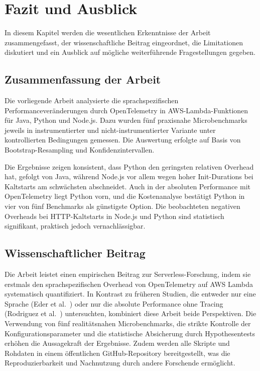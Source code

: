 \chapter{Fazit und Ausblick}
\label{ch:chapter07}

In diesem Kapitel werden die wesentlichen Erkenntnisse der Arbeit zusammengefasst, der wissenschaftliche Beitrag eingeordnet, die 
Limitationen diskutiert und ein Ausblick auf mögliche weiterführende Fragestellungen gegeben.

\section{Zusammenfassung der Arbeit}

Die vorliegende Arbeit analysierte die sprachspezifischen Performanceveränderungen durch OpenTelemetry in AWS-Lambda-Funktionen für Java, 
Python und Node.js. Dazu wurden fünf praxisnahe Microbenchmarks jeweils in instrumentierter und nicht-instrumentierter Variante 
unter kontrollierten Bedingungen gemessen. Die Auswertung erfolgte auf Basis von Bootstrap-Resampling und Konfidenzintervallen.

Die Ergebnisse zeigen konsistent, dass Python den geringsten relativen Overhead hat, gefolgt von Java, während Node.js vor allem 
wegen hoher Init-Durations bei Kaltstarts am schwächsten abschneidet. Auch in der absoluten Performance mit OpenTelemetry liegt 
Python vorn, und die Kostenanalyse bestätigt Python in vier von fünf Benchmarks als günstigste Option. Die beobachteten negativen 
Overheads bei HTTP-Kaltstarts in Node.js und Python sind statistisch signifikant, praktisch jedoch vernachlässigbar.

\section{Wissenschaftlicher Beitrag}

Die Arbeit leistet einen empirischen Beitrag zur Serverless-Forschung, indem sie erstmals den sprachspezifischen Overhead von 
OpenTelemetry auf AWS Lambda systematisch quantifiziert. In Kontrast zu früheren Studien, die entweder nur eine Sprache 
(Eder et al.~\cite{10254754}) oder nur die absolute Performance ohne Tracing (Rodriguez et al.~\cite{Rodriguez2024Evaluation}) 
untersuchten, kombiniert diese Arbeit beide Perspektiven. Die Verwendung von fünf realitätsnahen Microbenchmarks, die strikte 
Kontrolle der Konfigurationsparameter und die statistische Absicherung durch Hypothesentests erhöhen die Aussagekraft der Ergebnisse. 
Zudem werden alle Skripte und Rohdaten in einem öffentlichen GitHub-Repository bereitgestellt, was die Reproduzierbarkeit und Nachnutzung 
durch andere Forschende ermöglicht.

